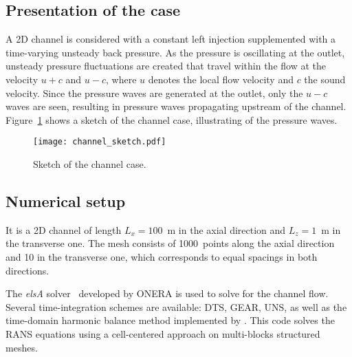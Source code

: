 \subsection{Presentation of the case}
\label{sub:presentation_of_the_case}

A 2D channel is considered  with a constant left injection
supplemented with a time-varying unsteady back pressure.
As the pressure is oscillating at the outlet, unsteady pressure
fluctuations are created that travel within the flow at the velocity 
$u + c$ and $u - c$, where $u$ denotes 
the local flow velocity and $c$ the sound velocity.
Since the pressure waves are generated at the outlet, only
the $u-c$ waves are seen, resulting in pressure waves propagating
upstream of the channel. Figure~\ref{fig:canal_principle} shows a sketch
of the channel case, illustrating of
the pressure waves.
\begin{figure}[htb]
  \centering
  \texttt{[image: channel\_sketch.pdf]}
  \caption{Sketch of the channel case.}
  \label{fig:canal_principle}
\end{figure}

\subsection{Numerical setup}

It is a 2D channel of length $L_x = 100$~m in the axial
direction and $L_z = 1$~m in the transverse one.
The mesh consists of 1000~points along the axial direction and 10 in the
transverse one, which corresponds to equal spacings in both
directions.

The \emph{elsA} solver~\cite{Cambier2013} developed by ONERA
is used to solve for the channel flow. Several time-integration schemes
are available: DTS, GEAR, UNS, 
as well as the time-domain harmonic 
balance method implemented by \citet{JSicot2008}. 
This code solves the RANS equations using a cell-centered
approach on multi-blocks structured meshes.

